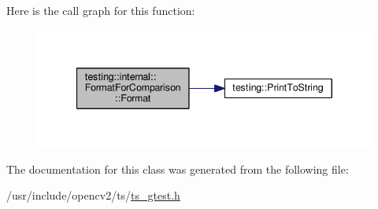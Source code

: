 Here is the call graph for this function\-:\nopagebreak
\begin{figure}[H]
\begin{center}
\leavevmode
\includegraphics[width=340pt]{classtesting_1_1internal_1_1FormatForComparison_a2aeb688fc55b57abd3021d82eccad896_cgraph}
\end{center}
\end{figure}




The documentation for this class was generated from the following file\-:\begin{DoxyCompactItemize}
\item 
/usr/include/opencv2/ts/\hyperlink{ts__gtest_8h}{ts\-\_\-gtest.\-h}\end{DoxyCompactItemize}

